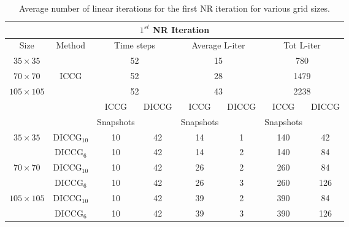 \documentclass[12pt]{article}
\begin{document}
\begin{table}[!h]\centering
\begin{minipage}{1\textwidth}
\vspace{-10pt}
\centering
\begin{tabular}{ |c|c|c|c|c|c|c|c|} 
  \hline
\multicolumn{8}{|c|}{$1^{st}$ NR Iteration}  \\
\hline
Size&Method&  \multicolumn{2}{|c|}{Time steps} &\multicolumn{2}{|c|}{Average L-iter} & \multicolumn{2}{|c|}{Tot L-iter}\\
\hline
$35\times35$& &\multicolumn{2}{|c|}{52} & \multicolumn{2}{|c|}{15}& \multicolumn{2}{|c|}{780} \\

$70\times70$&ICCG&\multicolumn{2}{|c|}{52}& \multicolumn{2}{|c|}{28}& \multicolumn{2}{|c|}{1479}\\

$105\times105$& & \multicolumn{2}{|c|}{52} &\multicolumn{2}{|c|}{43} & \multicolumn{2}{|c|}{2238}\\
\hline
&&ICCG&DICCG&ICCG&DICCG&ICCG&DICCG\\
&&Snapshots&&Snapshots&&Snapshots&\\
\hline
$35\times35$&DICCG$_{10}$&10&42&14&1&140&42 \\
&DICCG$_6$&10&42&14&2&140&84 \\
\hline
$70\times70$&DICCG$_{10}$ &10&42 &26&2&260&84 \\
&DICCG$_6$ &10&42&26&3&260&126\\
\hline
$105\times105$&DICCG$_{10}$ &10&42 &39&2&390&84 \\
&DICCG$_6$&10&42&39&3&390&126 \\
\hline
 \end{tabular}
\caption{Average number of linear iterations for the first NR iteration for various grid sizes. }\label{table:liters1}
\end{minipage}
\end{table}
\end{document}
